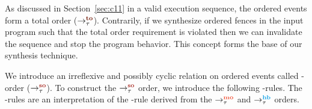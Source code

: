 As discussed in Section~\ref{sec:c11} in a valid \cc execution 
sequence, the \sc ordered events form a total order ($\setTO$).
%
Contrarily, if we synthesize \sc ordered fences in the input program 
such that the total order requirement is violated then we can
invalidate the sequence and stop the program behavior.
This concept forms the base of our synthesis technique.

We introduce an irreflexive and possibly cyclic relation
on \sc ordered events called \sc-order ($\setSO$).
%
To construct the $\setSO$ order, we introduce the following \lso-rules.
The \lso-rules are an interpretation of the \lto-rule derived from
the $\setMO$ and $\setHB$ orders.

